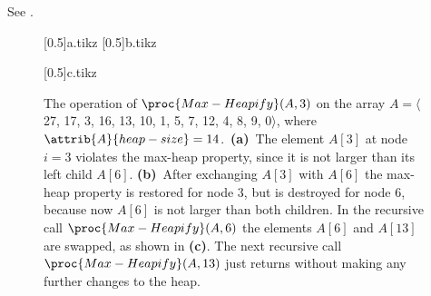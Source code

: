 See .
\begin{figure}[htb]
    \captionsetup[subfigure]{}
    \subcaptionbox{\label{fig:6.2-1a}}[0.5\textwidth]{{a.tikz}}
    \subcaptionbox{\label{fig:6.2-1b}}[0.5\textwidth]{{b.tikz}}
    \par\vspace{5mm}
    \subcaptionbox{\label{fig:6.2-1c}}[0.5\textwidth]{{c.tikz}}
    \caption{The operation of $\proc{Max-Heapify}(A,3)$ on the array $A=\langle$27, 17, 3, 16, 13, 10, 1, 5, 7, 12, 4, 8, 9, 0$\rangle$, where $\attrib{A}{heap-size}=14$.\,
    \textbf{(a)}\, The element $A[3]$ at node $i=3$ violates the max-heap property, since it is not larger than its left child $A[6]$.
    \textbf{(b)}\, After exchanging $A[3]$ with $A[6]$ the max-heap property is restored for node 3, but is destroyed for node 6, because now $A[6]$ is not larger than both children.
    In the recursive call $\proc{Max-Heapify}(A,6)$ the elements $A[6]$ and $A[13]$ are swapped, as shown in \textbf{(c)}.
    The next recursive call $\proc{Max-Heapify}(A,13)$ just returns without making any further changes to the heap.} \label{fig:6.2-1}
\end{figure}
